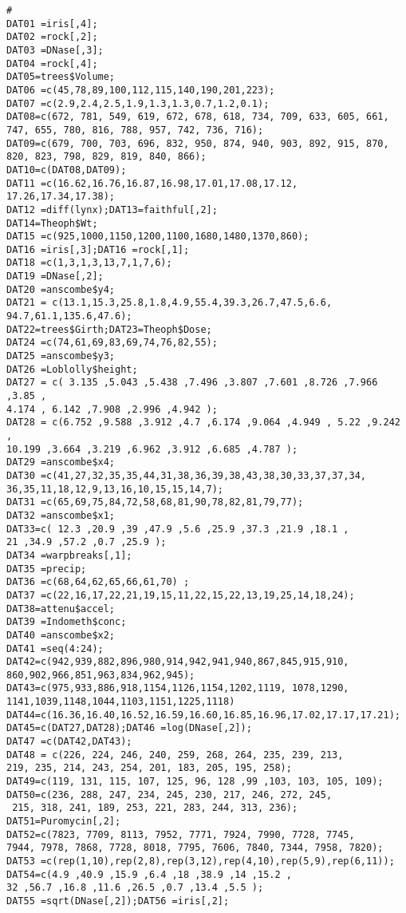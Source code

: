 \documentclass[a4paper,12pt]{article}
\begin{document}
\begin{verbatim}
#
DAT01 =iris[,4];
DAT02 =rock[,2];
DAT03 =DNase[,3];
DAT04 =rock[,4];
DAT05=trees$Volume;
DAT06 =c(45,78,89,100,112,115,140,190,201,223);
DAT07 =c(2.9,2.4,2.5,1.9,1.3,1.3,0.7,1.2,0.1);
DAT08=c(672, 781, 549, 619, 672, 678, 618, 734, 709, 633, 605, 661, 
747, 655, 780, 816, 788, 957, 742, 736, 716); 
DAT09=c(679, 700, 703, 696, 832, 950, 874, 940, 903, 892, 915, 870, 
820, 823, 798, 829, 819, 840, 866);
DAT10=c(DAT08,DAT09);
DAT11 =c(16.62,16.76,16.87,16.98,17.01,17.08,17.12, 17.26,17.34,17.38);
DAT12 =diff(lynx);DAT13=faithful[,2];
DAT14=Theoph$Wt;
DAT15 =c(925,1000,1150,1200,1100,1680,1480,1370,860);
DAT16 =iris[,3];DAT16 =rock[,1];
DAT18 =c(1,3,1,3,13,7,1,7,6);
DAT19 =DNase[,2];
DAT20 =anscombe$y4;
DAT21 = c(13.1,15.3,25.8,1.8,4.9,55.4,39.3,26.7,47.5,6.6,
94.7,61.1,135.6,47.6);
DAT22=trees$Girth;DAT23=Theoph$Dose;
DAT24 =c(74,61,69,83,69,74,76,82,55);
DAT25 =anscombe$y3;
DAT26 =Loblolly$height;
DAT27 = c( 3.135 ,5.043 ,5.438 ,7.496 ,3.807 ,7.601 ,8.726 ,7.966 ,3.85 ,
4.174 , 6.142 ,7.908 ,2.996 ,4.942 );
DAT28 = c(6.752 ,9.588 ,3.912 ,4.7 ,6.174 ,9.064 ,4.949 , 5.22 ,9.242 ,
10.199 ,3.664 ,3.219 ,6.962 ,3.912 ,6.685 ,4.787 );
DAT29 =anscombe$x4;
DAT30 =c(41,27,32,35,35,44,31,38,36,39,38,43,38,30,33,37,37,34,
36,35,11,18,12,9,13,16,10,15,15,14,7);
DAT31 =c(65,69,75,84,72,58,68,81,90,78,82,81,79,77);
DAT32 =anscombe$x1;
DAT33=c( 12.3 ,20.9 ,39 ,47.9 ,5.6 ,25.9 ,37.3 ,21.9 ,18.1 ,
21 ,34.9 ,57.2 ,0.7 ,25.9 );
DAT34 =warpbreaks[,1];
DAT35 =precip;
DAT36 =c(68,64,62,65,66,61,70) ;
DAT37 =c(22,16,17,22,21,19,15,11,22,15,22,13,19,25,14,18,24);
DAT38=attenu$accel;
DAT39 =Indometh$conc;
DAT40 =anscombe$x2;
DAT41 =seq(4:24);
DAT42=c(942,939,882,896,980,914,942,941,940,867,845,915,910,
860,902,966,851,963,834,962,945);
DAT43=c(975,933,886,918,1154,1126,1154,1202,1119, 1078,1290,
1141,1039,1148,1044,1103,1151,1225,1118)
DAT44=c(16.36,16.40,16.52,16.59,16.60,16.85,16.96,17.02,17.17,17.21);
DAT45=c(DAT27,DAT28);DAT46 =log(DNase[,2]);
DAT47 =c(DAT42,DAT43);
DAT48 = c(226, 224, 246, 240, 259, 268, 264, 235, 239, 213, 
219, 235, 214, 243, 254, 201, 183, 205, 195, 258); 
DAT49=c(119, 131, 115, 107, 125, 96, 128 ,99 ,103, 103, 105, 109);
DAT50=c(236, 288, 247, 234, 245, 230, 217, 246, 272, 245,
 215, 318, 241, 189, 253, 221, 283, 244, 313, 236);
DAT51=Puromycin[,2];
DAT52=c(7823, 7709, 8113, 7952, 7771, 7924, 7990, 7728, 7745, 
7944, 7978, 7868, 7728, 8018, 7795, 7606, 7840, 7344, 7958, 7820); 
DAT53 =c(rep(1,10),rep(2,8),rep(3,12),rep(4,10),rep(5,9),rep(6,11));
DAT54=c(4.9 ,40.9 ,15.9 ,6.4 ,18 ,38.9 ,14 ,15.2 ,
32 ,56.7 ,16.8 ,11.6 ,26.5 ,0.7 ,13.4 ,5.5 );
DAT55 =sqrt(DNase[,2]);DAT56 =iris[,2];

\end{verbatim}
\end{document}

